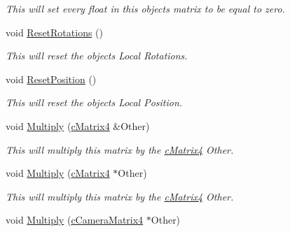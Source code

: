 \begin{DoxyCompactItemize}
\begin{DoxyCompactList}\small\item\em This will set every float in this objects matrix to be equal to zero. \end{DoxyCompactList}\item 
\hypertarget{classc_matrix4_a0d04302f66eb8afc0f2e8d7b880a0873}{
void \hyperlink{classc_matrix4_a0d04302f66eb8afc0f2e8d7b880a0873}{ResetRotations} ()}
\label{classc_matrix4_a0d04302f66eb8afc0f2e8d7b880a0873}

\begin{DoxyCompactList}\small\item\em This will reset the objects Local Rotations. \end{DoxyCompactList}\item 
\hypertarget{classc_matrix4_ac8048c00e45627f5910271ad8eb24c80}{
void \hyperlink{classc_matrix4_ac8048c00e45627f5910271ad8eb24c80}{ResetPosition} ()}
\label{classc_matrix4_ac8048c00e45627f5910271ad8eb24c80}

\begin{DoxyCompactList}\small\item\em This will reset the objects Local Position. \end{DoxyCompactList}\item 
\hypertarget{classc_matrix4_afc8fe82a6dfb40e77abc3117d10c18e5}{
void \hyperlink{classc_matrix4_afc8fe82a6dfb40e77abc3117d10c18e5}{Multiply} (\hyperlink{classc_matrix4}{cMatrix4} \&Other)}
\label{classc_matrix4_afc8fe82a6dfb40e77abc3117d10c18e5}

\begin{DoxyCompactList}\small\item\em This will multiply this matrix by the \hyperlink{classc_matrix4}{cMatrix4} Other. \end{DoxyCompactList}\item 
\hypertarget{classc_matrix4_aa36c01bc7f4f7a7ac47c1e154cd8a4ba}{
void \hyperlink{classc_matrix4_aa36c01bc7f4f7a7ac47c1e154cd8a4ba}{Multiply} (\hyperlink{classc_matrix4}{cMatrix4} $\ast$Other)}
\label{classc_matrix4_aa36c01bc7f4f7a7ac47c1e154cd8a4ba}

\begin{DoxyCompactList}\small\item\em This will multiply this matrix by the \hyperlink{classc_matrix4}{cMatrix4} Other. \end{DoxyCompactList}\item 
\hypertarget{classc_matrix4_a4eddb15044110cb20c1fa8df80bf1e05}{
void \hyperlink{classc_matrix4_a4eddb15044110cb20c1fa8df80bf1e05}{Multiply} (\hyperlink{classc_camera_matrix4}{cCameraMatrix4} $\ast$Other)}
\label{classc_matrix4_a4eddb15044110cb20c1fa8df80bf1e05}


\end{DoxyCompactItemize}
